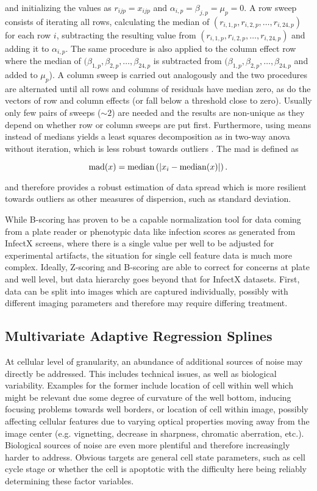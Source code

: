 and initializing the values as $r_{ijp} = x_{ijp}$ and $\alpha_{i,p} = \beta_{j,p} = \mu_p = 0$. A row sweep consists of iterating all rows, calculating the median of $(r_{i,1,p}, r_{i,2,p}, \dotsc, r_{i,24,p})$ for each row $i$, subtracting the resulting value from $(r_{i,1,p}, r_{i,2,p}, \dotsc, r_{i,24,p})$ and adding it to $\alpha_{i,p}$. The same procedure is also applied to the column effect row where the median of $(\beta_{1,p}, \beta_{2,p}, \dotsc, \beta_{24,p}$ is subtracted from $(\beta_{1,p}, \beta_{2,p}, \dotsc, \beta_{24,p}$ and added to $\mu_p$). A column sweep is carried out analogously and the two procedures are alternated until all rows and columns of residuals have median zero, as do the vectors of row and column effects (or fall below a threshold close to zero). Usually only few pairs of sweeps ($\sim 2$) are needed and the results are non-unique as they depend on whether row or column sweeps are put first. Furthermore, using means instead of medians yields a least squares decomposition as in two-way \gls{anova} without iteration, which is less robust towards outliers \citep{Brown2004,Venables2002}. The \gls{mad} is defined as

\begin{equation}
  \operatorname{mad}(x) = \operatorname{median}\left(\lvert x_i-\operatorname{median}(x)\rvert\right).
\end{equation}

and therefore provides a robust estimation of data spread which is more resilient towards outliers as other measures of dispersion, such as standard deviation.

While B-scoring has proven to be a capable normalization tool for data coming from a plate reader or phenotypic data like infection scores as generated from InfectX screens, where there is a single value per well to be adjusted for experimental artifacts, the situation for single cell feature data is much more complex. Ideally, Z-scoring and B-scoring are able to correct for concerns at plate and well level, but data hierarchy goes beyond that for InfectX datasets. First, data can be split into images which are captured individually, possibly with different imaging parameters and therefore may require differing treatment.

\subsection{Multivariate Adaptive Regression Splines}
At cellular level of granularity, an abundance of additional sources of noise may directly be addressed. This includes technical issues, as well as biological variability. Examples for the former include location of cell within well which might be relevant due some degree of curvature of the well bottom, inducing focusing problems towards well borders, or location of cell within image, possibly affecting cellular features due to varying optical properties moving away from the image center (e.g. vignetting, decrease in sharpness, chromatic aberration, etc.). Biological sources of noise are even more plentiful and therefore increasingly harder to address. Obvious targets are general cell state parameters, such as cell cycle stage or whether the cell is apoptotic with the difficulty here being reliably determining these factor variables.


